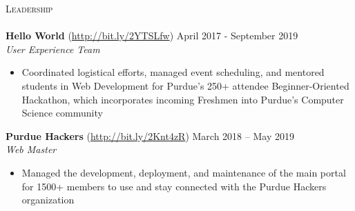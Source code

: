 \documentclass[a4paper, 10pt]{article}
\newcommand{\lineunder} {
    \vspace*{-8pt} \\
    \hspace*{-18pt} \hrulefill \\
}
\newcommand{\header} [1] {
    {
        \hspace*{-18pt}\vspace*{6pt}
        {\large\textsc{#1}}
    }
    \vspace*{-6pt} \lineunder
}
\begin{document}
\header{Leadership}

{\textbf{Hello World}} (\href{http://bit.ly/2YTSLfw}{http://bit.ly/2YTSLfw}) \hfill April 2017 - September 2019\\
\textit{User Experience Team}\\
\vspace{-1mm}
\begin{itemize} \itemsep 1pt
	\item Coordinated logistical efforts, managed event scheduling, and mentored students in Web Development for Purdue’s 250+ attendee Beginner-Oriented Hackathon, which incorporates incoming Freshmen into Purdue’s Computer Science community
\end{itemize}

\textbf{Purdue Hackers} (\href{http://bit.ly/2Knt4zR}{http://bit.ly/2Knt4zR})
\hfill March 2018 -- May 2019\\
\textit{Web Master}\\
\vspace{-1mm}
\begin{itemize} \itemsep 1pt
	\item Managed the development, deployment, and maintenance of the main portal for 1500+ members to use and stay connected with the Purdue Hackers organization
\end{itemize}

\vspace*{2mm}

\
\end{document}
